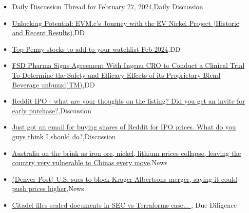 \documentclass{article}%
\begin{document}
%
\begin{itemize}%
\item%
\href{https://reddit.com/r/wallstreetbets/comments/1b196vb/daily\_discussion\_thread\_for\_february\_27\_2024/}{Daily Discussion Thread for February 27, 2024},Daily Discussion%
\item%
\href{https://reddit.com/r/Baystreetbets/comments/1b0ywie/unlocking\_potential\_evmcs\_journey\_with\_the\_ev/}{Unlocking Potential: EVM.c's Journey with the EV Nickel Project (Historic and Recent Results)},DD%
\item%
\href{https://reddit.com/r/Baystreetbets/comments/1b0otno/top\_penny\_stocks\_to\_add\_to\_your\_watchlist\_feb\_2024/}{Top Penny stocks to add to your watchlist Feb 2024},DD%
\item%
\href{https://reddit.com/r/Baystreetbets/comments/1b0irdf/fsd\_pharma\_signs\_agreement\_with\_ingenu\_cro\_to/}{FSD Pharma Signs Agreement With Ingenu CRO to Conduct a Clinical Trial To Determine the Safety and Efficacy Effects of its Proprietary Blend Beverage unbuzzd(TM)},DD%
\item%
\href{https://reddit.com/r/StockMarket/comments/1b0ze4q/reddit\_ipo\_what\_are\_your\_thoughts\_on\_the\_listing/}{Reddit IPO - what are your thoughts on the listing? Did you get an invite for early purchase?},Discussion%
\item%
\href{https://reddit.com/r/StockMarket/comments/1b0n89d/just\_got\_an\_email\_for\_buying\_shares\_of\_reddit\_for/}{Just got an email for buying shares of Reddit for IPO prices. What do you guys think I should do?},Discussion%
\item%
\href{https://reddit.com/r/Economics/comments/1b0u37q/australia\_on\_the\_brink\_as\_iron\_ore\_nickel\_lithium/}{Australia on the brink as iron ore, nickel, lithium prices collapse, leaving the country very vulnerable to Chinas every move},News%
\item%
\href{https://reddit.com/r/Economics/comments/1b0obb1/denver\_post\_us\_sues\_to\_block\_krogeralbertsons/}{(Denver Post) U.S. sues to block Kroger-Albertsons merger, saying it could push prices higher},News%
\item%
\href{https://reddit.com/r/Superstonk/comments/1b0tsz7/citadel\_files\_sealed\_documents\_in\_sec\_vs/}{Citadel files sealed documents in SEC vs Terraforms case... }, Due Diligence%
\end{itemize}%
\end{document}
